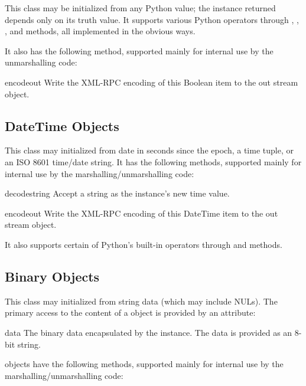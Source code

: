 This class may be initialized from any Python value; the instance
returned depends only on its truth value.  It supports various Python
operators through , ,
, and  methods, all
implemented in the obvious ways.

It also has the following method, supported mainly for internal use by
the unmarshalling code:

\begin{methoddesc}{encode}{out}
Write the XML-RPC encoding of this Boolean item to the out stream object.
\end{methoddesc}


\subsection{DateTime Objects \label{datetime-objects}}

This class may initialized from date in seconds since the epoch, a
time tuple, or an ISO 8601 time/date string.  It has the following
methods, supported mainly for internal use by the
marshalling/unmarshalling code:

\begin{methoddesc}{decode}{string}
Accept a string as the instance's new time value.
\end{methoddesc}

\begin{methoddesc}{encode}{out}
Write the XML-RPC encoding of this DateTime item to the out stream object.
\end{methoddesc}

It also supports certain of Python's built-in operators through 
 and  methods.


\subsection{Binary Objects \label{binary-objects}}

This class may initialized from string data (which may include NULs).
The primary access to the content of a  object is
provided by an attribute:

\begin{memberdesc}[Binary]{data}
The binary data encapsulated by the  instance.  The data
is provided as an 8-bit string.
\end{memberdesc}

 objects have the following methods, supported mainly
for internal use by the marshalling/unmarshalling code:

